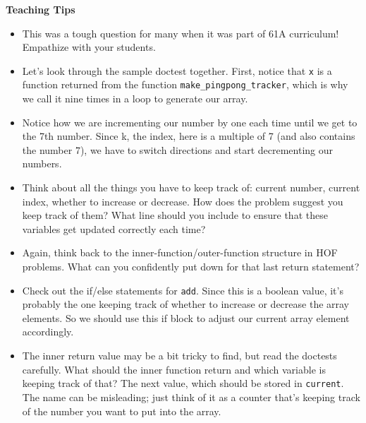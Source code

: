 \begin{blocksection}
\begin{guide}
\textbf{Teaching Tips}
\begin{itemize}
\item This was a tough question for many when it was part of 61A curriculum! Empathize with your students. 
\item Let's look through the sample doctest together. First, notice that \texttt{x} is a function returned from the function \texttt{make\_pingpong\_tracker}, which is why we call it nine times in a loop to generate our array.
\item Notice how we are incrementing our number by one each time until we get to the 7th number. Since k, the index, here is a multiple of 7 (and also contains the number 7), we have to switch directions and start decrementing our numbers.
\item Think about all the things you have to keep track of: current number, current index, whether to increase or decrease. How does the problem suggest you keep track of them? What line should you include to ensure that these variables get updated correctly each time?
\item Again, think back to the inner-function/outer-function structure in HOF problems. What can you confidently put down for that last return statement?
\item Check out the if/else statements for \texttt{add}. Since this is a boolean value, it's probably the one keeping track of whether to increase or decrease the array elements. So we should use this if block to adjust our current array element accordingly.
\item The inner return value may be a bit tricky to find, but read the doctests carefully. What should the inner function return and which variable is keeping track of that? The next value, which should be stored in \texttt{current}. The name can be misleading; just think of it as a counter that's keeping track of the number you want to put into the array.
\end{itemize}
\end{guide}
\end{blocksection}
